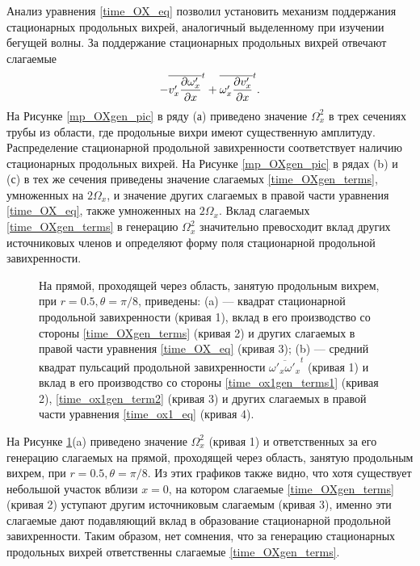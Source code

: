 Анализ уравнения \eqref{time_OX_eq} позволил установить механизм поддержания стационарных продольных вихрей, аналогичный выделенному при изучении бегущей волны. За поддержание стационарных продольных вихрей отвечают слагаемые 
\begin{equation} \label{time_OXgen_terms}
- \overline{v'_x \frac{\partial \omega'_x}{\partial x}}^t + \overline{\omega'_x \frac{\partial v'_x}{\partial x}}^t. 
\end{equation}
На Рисунке \ref{mp_OXgen_pic} в ряду (а) приведено значение $\Omega_x^2$ в трех сечениях трубы из области, где продольные вихри имеют существенную амплитуду. Распределение стационарной продольной завихренности соответствует наличию стационарных продольных вихрей. На Рисунке \ref{mp_OXgen_pic} в рядах (b) и (с) в тех же сечения приведены значение слагаемых \eqref{time_OXgen_terms}, умноженных на $2\Omega_x$, и значение других слагаемых в правой части уравнения \eqref{time_OX_eq}, также умноженных на $2\Omega_x$. Вклад слагаемых \eqref{time_OXgen_terms} в генерацию $\Omega_x^2$ значительно превосходит вклад других источниковых членов и определяют форму поля стационарной продольной завихренности. 

\begin{figure}[h]
\caption{На прямой, проходящей через область, занятую продольным вихрем, при $r = 0.5, \theta = \pi/8$, приведены: (a) --- квадрат стационарной продольной завихренности (кривая 1), вклад в его производство со стороны \eqref{time_OXgen_terms} (кривая  2) и других слагаемых в правой части уравнения \eqref{time_OX_eq} (кривая 3); (b) --- средний квадрат пульсаций продольной завихренности $\overline{\omega'_x \omega'_x}^t$ (кривая 1) и вклад в его производство со стороны \eqref{time_ox1gen_terms1} (кривая  2), \eqref{time_ox1gen_term2} (кривая  3) и других слагаемых в правой части уравнения \eqref{time_ox1_eq} (кривая  4).}
\label{xline_oxgen_pic}
\end{figure}

На Рисунке \ref{xline_oxgen_pic}(a) приведено значение $\Omega_x^2$ (кривая 1) и ответственных за его генерацию слагаемых на прямой, проходящей через область, занятую продольным вихрем, при $r = 0.5, \theta = \pi/8$. Из этих графиков также видно, что хотя существует небольшой участок вблизи $x=0$, на котором слагаемые \eqref{time_OXgen_terms} (кривая 2) уступают другим источниковым слагаемым (кривая 3), именно эти слагаемые дают подавляющий вклад в образование стационарной продольной завихренности. Таким образом, нет сомнения, что за генерацию стационарных продольных вихрей ответственны слагаемые \eqref{time_OXgen_terms}. 

